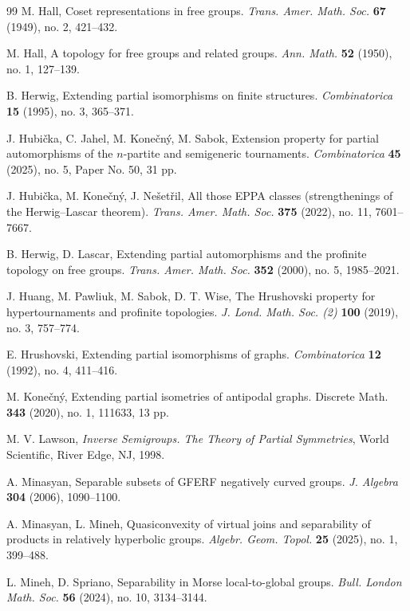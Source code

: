 \documentclass[11pt]{amsart}
\theoremstyle{definition}
\theoremstyle{definition}
\numberwithin{equation}{section}
\begin{document}
\begin{thebibliography}{99}
M. Hall, 
Coset representations in free groups. \textit{Trans. Amer. Math. Soc.} {\bf 67} (1949), no. 2, 421--432.

M. Hall,
A topology for free groups and related groups.
\textit{Ann. Math.} {\bf 52} (1950), no. 1, 127--139.

B. Herwig, 
Extending partial isomorphisms on finite structures.
\textit{Combinatorica} {\bf 15} (1995), no. 3, 365--371.

J. Hubi\v{c}ka, C. Jahel, M. Kone\v{c}n\'{y}, M. Sabok,
Extension property for partial automorphisms of the $n$-partite and semigeneric tournaments.
\textit{Combinatorica} {\bf 45} (2025), no. 5, Paper No. 50, 31 pp.

J. Hubi\v{c}ka, M. Kone\v{c}n\'{y}, J. Ne\v{s}et\v{r}il,
All those EPPA classes (strengthenings of the Herwig--Lascar theorem).
\textit{Trans. Amer. Math. Soc.} {\bf 375} (2022), no. 11, 7601--7667.

B. Herwig, D. Lascar, Extending partial automorphisms and the profinite topology on free
groups. \textit{Trans. Amer. Math. Soc.} {\bf 352} (2000), no. 5, 1985--2021.

J. Huang, M. Pawliuk, M. Sabok, D. T. Wise, 
The Hrushovski property for hypertournaments and profinite topologies.
\textit{J. Lond. Math. Soc. (2)} {\bf 100} (2019), no. 3, 757--774.

E. Hrushovski, 
Extending partial isomorphisms of graphs.
\textit{Combinatorica} {\bf 12} (1992), no. 4, 411--416.

M. Kone\v{c}n\'{y},
Extending partial isometries of antipodal graphs.
Discrete Math. {\bf 343} (2020), no. 1, 111633, 13 pp.

M. V. Lawson, 
\textit{Inverse Semigroups. The Theory of Partial Symmetries}, 
World Scientific, River Edge, NJ, 1998.



A. Minasyan,
Separable subsets of GFERF negatively curved groups.
\textit{J. Algebra} {\bf 304} (2006), 1090--1100.

A. Minasyan, L. Mineh,
Quasiconvexity of virtual joins and separability of products in relatively hyperbolic groups.
\textit{Algebr. Geom. Topol.} {\bf 25} (2025), no. 1, 399--488.

L. Mineh, D. Spriano,
Separability in Morse local-to-global groups.
\textit{Bull. London Math. Soc.} {\bf 56} (2024), no. 10, 3134--3144.


\end{thebibliography}
\end{document}

